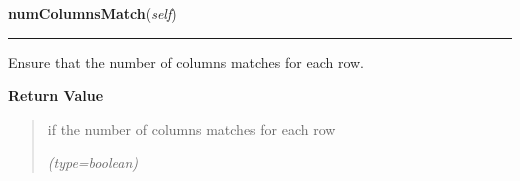     \vspace{0.5ex}

\hspace{.8\funcindent}\begin{boxedminipage}{\funcwidth}

    \raggedright \textbf{numColumnsMatch}(\textit{self})

    \vspace{-1.5ex}

    \rule{\textwidth}{0.5\fboxrule}
\setlength{\parskip}{2ex}
    Ensure that the number of columns matches for each row.

\setlength{\parskip}{1ex}
      \textbf{Return Value}
    \vspace{-1ex}

      \begin{quote}
      if the number of columns matches for each row

      {\it (type=boolean)}

      \end{quote}

    \end{boxedminipage}

    \label{UnBlockMeSolver:Map:Map:Map:topBottomRowsValid}

    \vspace{0.5ex}

